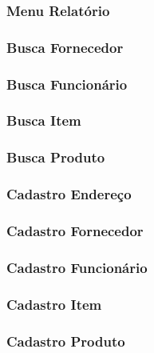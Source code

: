 \subsubsection{Menu Relatório}

\subsubsection{Busca Fornecedor}

\subsubsection{Busca Funcionário}

\subsubsection{Busca Item}

\subsubsection{Busca Produto}

\subsubsection{Cadastro Endereço}

\subsubsection{Cadastro Fornecedor}

\subsubsection{Cadastro Funcionário}

\subsubsection{Cadastro Item}

\subsubsection{Cadastro Produto}

